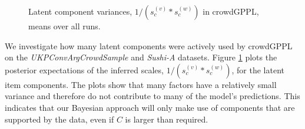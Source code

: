 \begin{figure}[t]
\centering
{}
\caption{
Latent component variances, $1/(s^{(v)}_c * s^{(w)}_c)$ in crowdGPPL, means over all runs.
}
\label{fig:latent_factor_variance}
\end{figure}
We investigate how many latent components were actively used by 
 crowdGPPL on the \emph{UKPConvArgCrowdSample} and \emph{Sushi-A} datasets.
Figure \ref{fig:latent_factor_variance}
plots the posterior expectations of the inferred scales, $1/(s^{(v)}_c * s^{(w)}_c)$, for the latent item 
 components. 
 The plots show
that many factors have a relatively small variance and therefore do not contribute 
to many of the model's predictions. This indicates that 
our Bayesian approach will only make use of components that are supported by the data, 
even if $C$ is larger than required.

